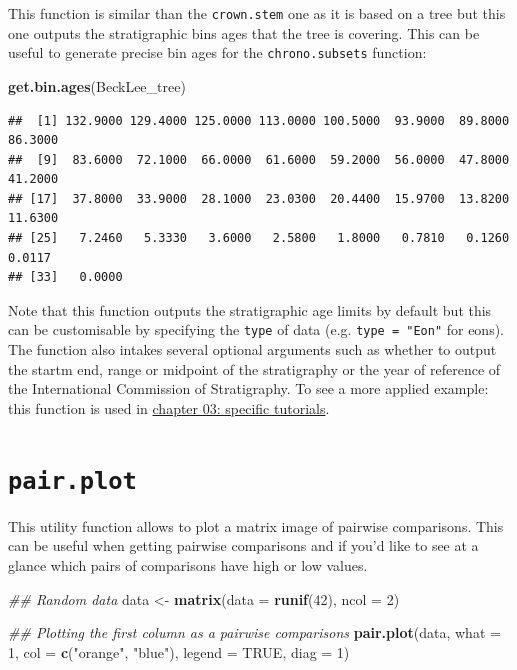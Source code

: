 \documentclass[]{book}
\newenvironment{Shaded}{\begin{snugshade}}{\end{snugshade}}
\newcommand{\CommentTok}[1]{\textcolor[rgb]{0.56,0.35,0.01}{\textit{#1}}}
\newcommand{\DataTypeTok}[1]{\textcolor[rgb]{0.13,0.29,0.53}{#1}}
\newcommand{\DecValTok}[1]{\textcolor[rgb]{0.00,0.00,0.81}{#1}}
\newcommand{\KeywordTok}[1]{\textcolor[rgb]{0.13,0.29,0.53}{\textbf{#1}}}
\newcommand{\NormalTok}[1]{#1}
\newcommand{\OtherTok}[1]{\textcolor[rgb]{0.56,0.35,0.01}{#1}}
\newcommand{\StringTok}[1]{\textcolor[rgb]{0.31,0.60,0.02}{#1}}
\begin{document}
This function is similar than the \texttt{crown.stem} one as it is based on a tree but this one outputs the stratigraphic bins ages that the tree is covering.
This can be useful to generate precise bin ages for the \texttt{chrono.subsets} function:

\begin{Shaded}
\begin{Highlighting}[]
\KeywordTok{get.bin.ages}\NormalTok{(BeckLee_tree)}
\end{Highlighting}
\end{Shaded}

\begin{verbatim}
##  [1] 132.9000 129.4000 125.0000 113.0000 100.5000  93.9000  89.8000  86.3000
##  [9]  83.6000  72.1000  66.0000  61.6000  59.2000  56.0000  47.8000  41.2000
## [17]  37.8000  33.9000  28.1000  23.0300  20.4400  15.9700  13.8200  11.6300
## [25]   7.2460   5.3330   3.6000   2.5800   1.8000   0.7810   0.1260   0.0117
## [33]   0.0000
\end{verbatim}

Note that this function outputs the stratigraphic age limits by default but this can be customisable by specifying the \texttt{type} of data (e.g. \texttt{type\ =\ "Eon"} for eons).
The function also intakes several optional arguments such as whether to output the startm end, range or midpoint of the stratigraphy or the year of reference of the International Commission of Stratigraphy.
To see a more applied example: this function is used in \protect\hyperlink{chrono-subsets}{chapter 03: specific tutorials}.

\hypertarget{pair.plot}{%
\section{\texorpdfstring{\texttt{pair.plot}}{pair.plot}}\label{pair.plot}}

This utility function allows to plot a matrix image of pairwise comparisons.
This can be useful when getting pairwise comparisons and if you'd like to see at a glance which pairs of comparisons have high or low values.

\begin{Shaded}
\begin{Highlighting}[]
\CommentTok{## Random data}
\NormalTok{data <-}\StringTok{ }\KeywordTok{matrix}\NormalTok{(}\DataTypeTok{data =} \KeywordTok{runif}\NormalTok{(}\DecValTok{42}\NormalTok{), }\DataTypeTok{ncol =} \DecValTok{2}\NormalTok{)}

\CommentTok{## Plotting the first column as a pairwise comparisons}
\KeywordTok{pair.plot}\NormalTok{(data, }\DataTypeTok{what =} \DecValTok{1}\NormalTok{, }\DataTypeTok{col =} \KeywordTok{c}\NormalTok{(}\StringTok{"orange"}\NormalTok{, }\StringTok{"blue"}\NormalTok{), }\DataTypeTok{legend =} \OtherTok{TRUE}\NormalTok{, }\DataTypeTok{diag =} \DecValTok{1}\NormalTok{)}
\end{Highlighting}
\end{Shaded}
\end{document}

